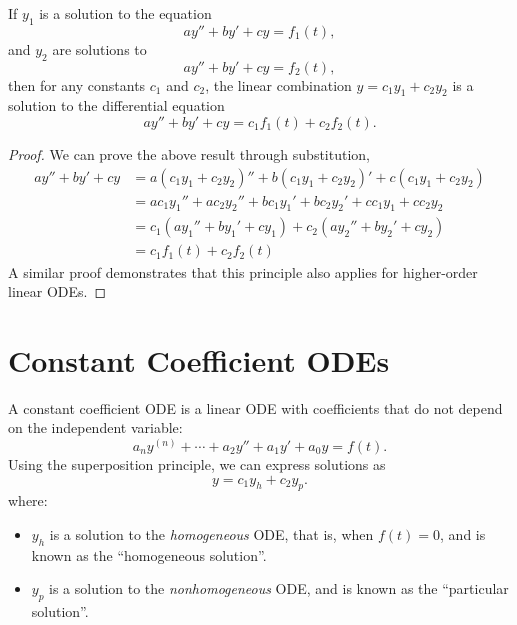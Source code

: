\documentclass{article}
\begin{document}
\begin{theorem}
    If \(y_1\) is a solution to the equation
    \begin{equation*}
        ay'' + by' + cy = f_1\left( t \right),
    \end{equation*}
    and \(y_2\) are solutions to
    \begin{equation*}
        ay'' + by' + cy = f_2\left( t \right),
    \end{equation*}
    then for any constants \(c_1\) and \(c_2\), the linear combination \(y = c_1 y_1 + c_2 y_2\) is a solution to the differential equation
    \begin{equation*}
        ay'' + by' + cy = c_1 f_1\left( t \right) + c_2 f_2\left( t \right).
    \end{equation*}
\end{theorem}
\begin{proof}
    We can prove the above result through substitution,
    \begin{align*}
        ay'' + by' + cy & = a\left( c_1 y_1 + c_2 y_2 \right)'' + b\left( c_1 y_1 + c_2 y_2 \right)' + c\left( c_1 y_1 + c_2 y_2 \right) \\
                        & = a c_1 y_1'' + a c_2 y_2'' + b c_1 y_1' + b c_2 y_2' + c c_1 y_1 + c c_2 y_2                                  \\
                        & = c_1 \left( a y_1'' + b y_1' + c y_1 \right) + c_2 \left( a y_2'' + b y_2' + c y_2 \right)                    \\
                        & = c_1 f_1\left( t \right) + c_2 f_2\left( t \right)
    \end{align*}
    A similar proof demonstrates that this principle also applies for higher-order linear ODEs.
\end{proof}
\section{Constant Coefficient ODEs}
A constant coefficient ODE is a linear ODE with coefficients that do not depend on the independent variable:
\begin{equation*}
    a_n y^{\left( n \right)} + \cdots + a_2 y'' + a_1 y' + a_0 y = f\left( t \right).
\end{equation*}
Using the superposition principle, we can express solutions as
\begin{equation*}
    y = c_1 y_h + c_2 y_p.
\end{equation*}
where:
\begin{itemize}
    \item \(y_h\) is a solution to the \emph{homogeneous} ODE, that is, when \(f\left( t \right) = 0\),
          and is known as the ``homogeneous solution''.
    \item \(y_p\) is a solution to the \emph{nonhomogeneous} ODE,
          and is known as the ``particular solution''.
\end{itemize}
\end{document}
